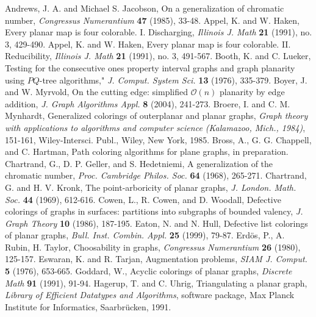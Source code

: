 \documentclass[letterpaper, 12pt]{article}
\theoremstyle{definition}
\theoremstyle{definition}
\theoremstyle{thm}
\theoremstyle{definition}
\begin{document}
\begin{thebibliography}{99}
	Andrews, J. A. and Michael S. Jacobson, On a generalization of chromatic number,
	\textit{Congressus Numerantium} \textbf{47} (1985), 33-48.
	Appel, K. and W. Haken, Every planar map is four colorable. I.
	Discharging, \textit{Illinois J. Math} \textbf{21} (1991), no. 3, 429-490.
	Appel, K. and W. Haken, Every planar map is four colorable. II.
	Reducibility, \textit{Illinois J. Math} \textbf{21} (1991), no. 3, 491-567.
	Booth, K. and C. Lueker, Testing for the consecutive ones property interval
	graphs and graph planarity using $PQ$-tree algorithms," \textit{J. Comput.
	System Sci.} \textbf{13} (1976), 335-379.
	Boyer, J. and W. Myrvold, On the cutting edge: simplified $\mathcal{O}(n)$ planarity by
	edge addition, \textit{J. Graph Algorithms Appl.} \textbf{8} (2004), 241-273.
	Broere, I. and C. M. Mynhardt, Generalized colorings of outerplanar and planar
	graphs, \textit{Graph theory with applications to algorithms and computer
	science (Kalamazoo, Mich., 1984)}, 151-161, Wiley-Intersci. Publ., Wiley,
	New York, 1985.
    Bross, A., G. G. Chappell, and C. Hartman, Path
    coloring algorithms for plane graphs, in preparation.
	Chartrand, G., D. P. Geller, and S. Hedetniemi, A generalization of the
	chromatic number, \textit{Proc. Cambridge Philos. Soc.} \textbf{64} (1968),
	265-271.
    Chartrand, G. and H. V. Kronk, The point-arboricity of planar graphs,
    \textit{J. London. Math. Soc.} \textbf{44} (1969), 612-616.
	Cowen, L., R. Cowen, and D. Woodall, Defective colorings of graphs in
	surfaces: partitions into subgraphs of bounded valency,
	\textit{J. Graph Theory} \textbf{10} (1986), 187-195.
	Eaton, N. and N. Hull, Defective list colorings of planar graphs,
	\emph{Bull. Inst. Combin. Appl.} \textbf{25} (1999), 79-87.
	Erd{\"o}s, P., A. Rubin, H. Taylor, Choosability in graphs,
	\textit{Congressus Numerantium} \textbf{26} (1980), 125-157.
	Eswaran, K. and R. Tarjan, Augmentation problems, \textit{SIAM J. Comput.}
	\textbf{5} (1976), 653-665.
    Goddard, W., Acyclic colorings of planar graphs, \textit{Discrete Math}
    \textbf{91} (1991), 91-94.
	Hagerup, T. and C. Uhrig, Triangulating a planar graph, \textit{Library of
	Efficient Datatypes and Algorithms}, software package, Max Planck Institute
	for Informatics, Saarbr{\"u}cken, 1991.

\end{thebibliography}
\end{document}
